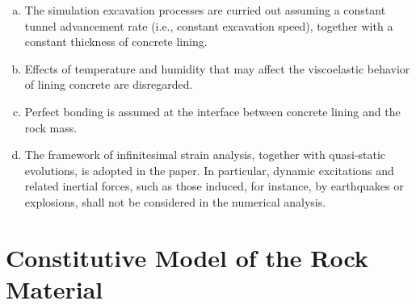 \documentclass[a4paper,fleqn]{cas-sc}
\begin{document}
\begin{enumerate}[(a)]
	\item The simulation excavation processes are curried out assuming a constant tunnel advancement rate (i.e., constant excavation speed), together with a constant thickness of concrete lining.
	
	\item Effects of temperature and humidity that may affect the viscoelastic behavior of lining concrete are disregarded.
	
	\item Perfect bonding is assumed at the interface between concrete lining and the rock mass.

	\item The framework of infinitesimal strain analysis, together with quasi-static evolutions, is adopted in the paper. In particular, dynamic excitations and related inertial forces, such as those induced, for instance, by earthquakes or explosions, shall not be considered in the numerical analysis.
	
\end{enumerate}

\section{Constitutive Model of the Rock Material}\label{sec3}
\end{document}
